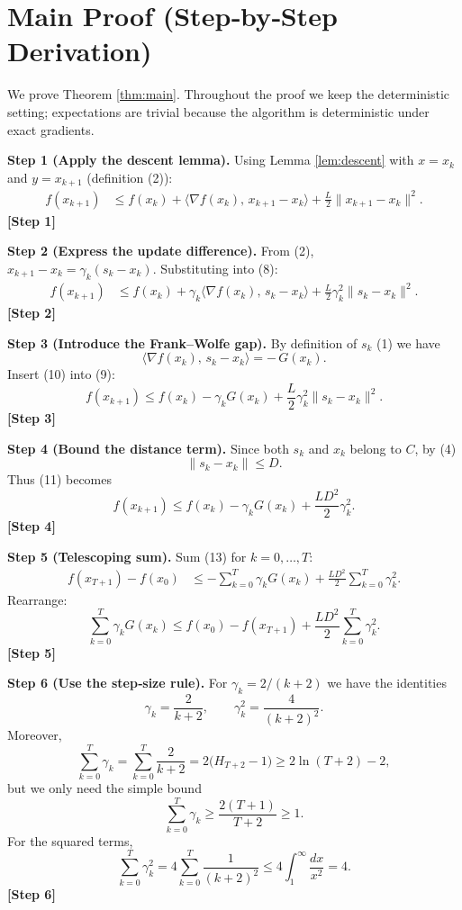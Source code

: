 \documentclass{article}
\begin{document}
\section*{Main Proof (Step‑by‑Step Derivation)}
We prove Theorem \ref{thm:main}.  Throughout the proof we keep the
deterministic setting; expectations are trivial because the algorithm is
deterministic under exact gradients.

\noindent\textbf{Step 1 (Apply the descent lemma).}  
Using Lemma \ref{lem:descent} with \(x=x_{k}\) and \(y=x_{k+1}\) (definition (2)):
\[
\begin{aligned}
f(x_{k+1})
&\le f(x_{k})+\langle\nabla f(x_{k}),\,x_{k+1}-x_{k}\rangle
     +\frac{L}{2}\|x_{k+1}-x_{k}\|^{2} . \tag{8}
\end{aligned}
\]
\textbf{[Step 1]}

\noindent\textbf{Step 2 (Express the update difference).}  
From (2),
\(x_{k+1}-x_{k}= \gamma_{k}(s_{k}-x_{k})\).  Substituting into (8):
\[
\begin{aligned}
f(x_{k+1})
&\le f(x_{k})+\gamma_{k}\langle\nabla f(x_{k}),\,s_{k}-x_{k}\rangle
     +\frac{L}{2}\gamma_{k}^{2}\|s_{k}-x_{k}\|^{2}. \tag{9}
\end{aligned}
\]
\textbf{[Step 2]}

\noindent\textbf{Step 3 (Introduce the Frank–Wolfe gap).}  
By definition of \(s_{k}\) (1) we have
\[
\langle\nabla f(x_{k}),\,s_{k}-x_{k}\rangle
= -\,G(x_{k}). \tag{10}
\]
Insert (10) into (9):
\[
f(x_{k+1})\le f(x_{k})-\gamma_{k}G(x_{k})
            +\frac{L}{2}\gamma_{k}^{2}\|s_{k}-x_{k}\|^{2}. \tag{11}
\]
\textbf{[Step 3]}

\noindent\textbf{Step 4 (Bound the distance term).}  
Since both \(s_{k}\) and \(x_{k}\) belong to \(C\), by (4)
\[
\|s_{k}-x_{k}\|\le D. \tag{12}
\]
Thus (11) becomes
\[
f(x_{k+1})\le f(x_{k})-\gamma_{k}G(x_{k})
            +\frac{L D^{2}}{2}\gamma_{k}^{2}. \tag{13}
\]
\textbf{[Step 4]}

\noindent\textbf{Step 5 (Telescoping sum).}  
Sum (13) for \(k=0,\dots,T\):
\[
\begin{aligned}
f(x_{T+1})-f(x_{0})
&\le -\sum_{k=0}^{T}\gamma_{k}G(x_{k})
   +\frac{L D^{2}}{2}\sum_{k=0}^{T}\gamma_{k}^{2}. \tag{14}
\end{aligned}
\]
Rearrange:
\[
\sum_{k=0}^{T}\gamma_{k}G(x_{k})
\le f(x_{0})-f(x_{T+1})
   +\frac{L D^{2}}{2}\sum_{k=0}^{T}\gamma_{k}^{2}. \tag{15}
\]
\textbf{[Step 5]}

\noindent\textbf{Step 6 (Use the step‑size rule).}  
For \(\gamma_{k}=2/(k+2)\) we have the identities
\[
\gamma_{k}= \frac{2}{k+2},\qquad
\gamma_{k}^{2}= \frac{4}{(k+2)^{2}}.
\]
Moreover,
\[
\sum_{k=0}^{T}\gamma_{k}
= \sum_{k=0}^{T}\frac{2}{k+2}
= 2\bigl(H_{T+2}-1\bigr)\ge 2\ln(T+2)-2,
\]
but we only need the simple bound
\[
\sum_{k=0}^{T}\gamma_{k}\ge \frac{2(T+1)}{T+2}\ge 1. \tag{16}
\]
For the squared terms,
\[
\sum_{k=0}^{T}\gamma_{k}^{2}
=4\sum_{k=0}^{T}\frac{1}{(k+2)^{2}}
\le 4\int_{1}^{\infty}\frac{dx}{x^{2}} =4. \tag{17}
\]
\textbf{[Step 6]}
\end{document}
